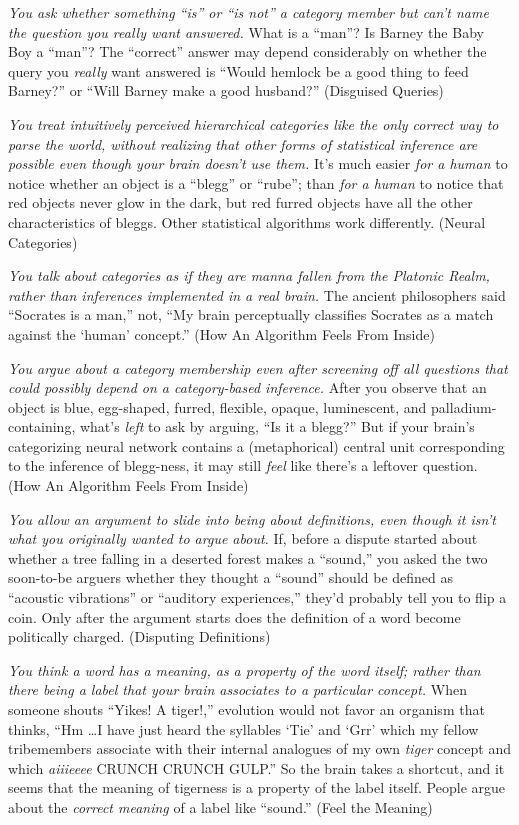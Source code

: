 {
 \textit{You ask whether something
``is'' or ``is
not'' a category member but can't
name the question you really want answered.} What is a
``man''? Is Barney the Baby Boy a
``man''? The
``correct'' answer may depend
considerably on whether the query you \textit{really} want answered is
``Would hemlock be a good thing to feed
Barney?'' or ``Will Barney make a
good husband?'' (Disguised Queries)}

{
 \textit{You treat intuitively perceived hierarchical categories
like the only correct way to parse the world, without realizing that
other forms of statistical inference are possible even though your
brain doesn't use them.} It's much
easier \textit{for a human} to notice whether an object is a
``blegg'' or
``rube''; than \textit{for a human}
to notice that red objects never glow in the dark, but red furred
objects have all the other characteristics of bleggs. Other statistical
algorithms work differently. (Neural Categories)}

{
 \textit{You talk about categories as if they are manna fallen from
the Platonic Realm, rather than inferences implemented in a real
brain.} The ancient philosophers said ``Socrates is a
man,'' not, ``My brain perceptually
classifies Socrates as a match against the
`human' concept.''
(How An Algorithm Feels From Inside)}

{
 \textit{You argue about a category membership even after screening
off all questions that could possibly depend on a category-based
inference.} After you observe that an object is blue, egg-shaped,
furred, flexible, opaque, luminescent, and palladium-containing,
what's \textit{left} to ask by arguing,
``Is it a blegg?'' But if your
brain's categorizing neural network contains a
(metaphorical) central unit corresponding to the inference of
blegg-ness, it may still \textit{feel} like there's a
leftover question. (How An Algorithm Feels From Inside)}

{
 \textit{You allow an argument to slide into being about
definitions, even though it isn't what you originally
wanted to argue about.} If, before a dispute started about whether a
tree falling in a deserted forest makes a
``sound,'' you asked the two
soon-to-be arguers whether they thought a
``sound'' should be defined as
``acoustic vibrations'' or
``auditory experiences,''
they'd probably tell you to flip a coin. Only after the
argument starts does the definition of a word become politically
charged. (Disputing Definitions)}

{
 \textit{You think a word has a meaning, as a property of the word
itself; rather than there being a label that your brain associates to a
particular concept.} When someone shouts ``Yikes! A
tiger!,'' evolution would not favor an organism that
thinks, ``Hm \ldots I have just heard the syllables
`Tie' and
`Grr' which my fellow tribemembers
associate with their internal analogues of my own \textit{tiger}
concept and which \textit{aiiieeee} CRUNCH CRUNCH
GULP.'' So the brain takes a shortcut, and it seems
that the meaning of tigerness is a property of the label itself. People
argue about the \textit{correct meaning} of a label like
``sound.'' (Feel the Meaning)}

